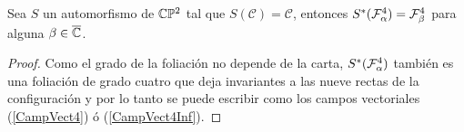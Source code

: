 \begin{Lema}
\label{Lema:Jalando}
Sea $S$ un automorfismo de $\CP$ tal que $S(\mathcal{C})=\mathcal{C}$, entonces $S^{*}(\Fol[4]{\alpha})=\Fol[4]{\beta}$ para alguna $\beta\in\overline\C$.
\end{Lema}

\begin{proof}
Como el grado de la foliación no depende de la carta, $S^{*}(\Fol[4]{\alpha})$ también es una foliación de grado cuatro que deja invariantes a las nueve rectas de la configuración y por lo tanto se puede escribir como los campos vectoriales (\ref{CampVect4}) ó (\ref{CampVect4Inf}).
\end{proof}








